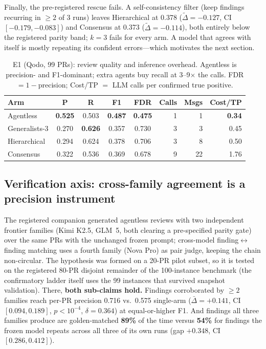 \documentclass[conference]{IEEEtran}
\begin{document}
Finally, the pre-registered rescue fails. A self-consistency filter (keep
findings recurring in ${\geq}2$ of 3 runs) leaves Hierarchical at 0.378
($\tilde\Delta{=}{-}0.127$, CI $[-0.179,-0.083]$) and Consensus at 0.373
($\tilde\Delta{=}{-}0.114$), both entirely below the registered parity band;
$k{=}3$ fails for every arm. A model that agrees with itself is mostly repeating
its confident errors---which motivates the next section.

\begin{table}[t]
\caption{E1 (Qodo, 99 PRs): review quality and inference overhead. Agentless is
precision- and F1-dominant; extra agents buy recall at 3--9$\times$ the calls.
FDR $=1-$precision; Cost/TP $=$ LLM calls per confirmed true positive.}
\label{tab:confirmatory}
\centering
\footnotesize
\begin{tabular}{@{}lccccrrr@{}}
\toprule
\textbf{Arm} & \textbf{P} & \textbf{R} & \textbf{F1} & \textbf{FDR} & \textbf{Calls} & \textbf{Msgs} & \textbf{Cost/TP} \\
\midrule
Agentless      & \textbf{0.525} & 0.503 & \textbf{0.487} & \textbf{0.475} & 1 & 1  & \textbf{0.34} \\
Generalists-3  & 0.270 & \textbf{0.626} & 0.357 & 0.730 & 3 & 3  & 0.45 \\
Hierarchical   & 0.294 & 0.624 & 0.378 & 0.706 & 3 & 8  & 0.50 \\
Consensus      & 0.322 & 0.536 & 0.369 & 0.678 & 9 & 22 & 1.76 \\
\bottomrule
\end{tabular}
\end{table}

\subsection{Verification axis: cross-family agreement is a precision instrument}
\label{sec:hetero}
The registered companion generated agentless reviews with two independent
frontier families (Kimi K2.5, GLM~5, both clearing a pre-specified parity gate)
over the same PRs with the unchanged frozen prompt; cross-model
finding$\leftrightarrow$finding matching uses a fourth family (Nova Pro) as pair
judge, keeping the chain non-circular. The hypothesis was formed on a 20-PR pilot
subset, so it is tested on the registered 80-PR disjoint remainder of the
100-instance benchmark (the confirmatory ladder itself uses the 99 instances that
survived snapshot validation). There, \textbf{both sub-claims hold.} Findings corroborated by ${\geq}2$
families reach per-PR precision 0.716 vs.\ 0.575 single-arm
($\bar\Delta{=}{+}0.141$, CI $[0.094,0.189]$, $p{<}10^{-4}$, $\delta{=}0.364$) at
equal-or-higher F1. And findings all three families produce are golden-matched
\textbf{89\%} of the time versus \textbf{54\%} for findings the frozen model
repeats across all three of its own runs (gap ${+}0.348$, CI $[0.286,0.412]$).
\end{document}

